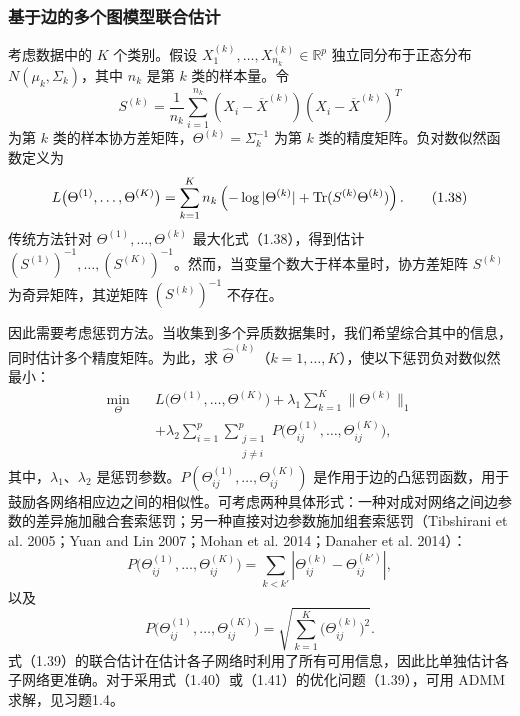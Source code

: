 \subsubsection{基于边的多个图模型联合估计}

考虑数据中的 $K$ 个类别。假设 $X_1^{(k)},\ldots,X_{n_k}^{(k)}\in\mathbb R^p$ 独立同分布于正态分布 $N(\mu_k,\Sigma_k)$，其中 $n_k$ 是第 $k$ 类的样本量。令
\[
S^{(k)}=\frac1{n_k}\sum_{i=1}^{n_k}(X_i-\overline X^{(k)})(X_i-\overline X^{(k)})^T
\]
为第 $k$ 类的样本协方差矩阵，$\Theta^{(k)}=\Sigma_k^{-1}$ 为第 $k$ 类的精度矩阵。负对数似然函数定义为
\begin{equation}
L\bigl(\Theta^{(1)},\ldots,\Theta^{(K)}\bigr)
=\sum_{k=1}^K n_k\left(-\log|\Theta^{(k)}|+\operatorname{Tr}(S^{(k)}\Theta^{(k)})\right).
\tag{1.38}
\end{equation}
传统方法针对 $\Theta^{(1)},\ldots,\Theta^{(k)}$ 最大化式（1.38），得到估计 $(S^{(1)})^{-1},\ldots,(S^{(K)})^{-1}$。然而，当变量个数大于样本量时，协方差矩阵 $S^{(k)}$ 为奇异矩阵，其逆矩阵 $(S^{(k)})^{-1}$ 不存在。

因此需要考虑惩罚方法。当收集到多个异质数据集时，我们希望综合其中的信息，同时估计多个精度矩阵。为此，求 $\widehat\Theta^{(k)}$（$k=1,\ldots,K$），使以下惩罚负对数似然最小：
\begin{equation}
\begin{aligned}
\min_{\Theta}\quad&L\bigl(\Theta^{(1)},\ldots,\Theta^{(K)}\bigr)
+\lambda_1\sum_{k=1}^K\|\Theta^{(k)}\|_1\\
&+\lambda_2\sum_{i=1}^p\sum_{\substack{j=1\\j\ne i}}^p
P\bigl(\Theta_{ij}^{(1)},\ldots,\Theta_{ij}^{(K)}\bigr),
\end{aligned}\tag{1.39}
\end{equation}
其中，$\lambda_1$、$\lambda_2$ 是惩罚参数。$P(\Theta_{ij}^{(1)},\ldots,\Theta_{ij}^{(K)})$ 是作用于边的凸惩罚函数，用于鼓励各网络相应边之间的相似性。可考虑两种具体形式：一种对成对网络之间边参数的差异施加融合套索惩罚；另一种直接对边参数施加组套索惩罚（Tibshirani et al. 2005；Yuan and Lin 2007；Mohan et al. 2014；Danaher et al. 2014）：
\begin{equation}
P\bigl(\Theta_{ij}^{(1)},\ldots,\Theta_{ij}^{(K)}\bigr)
=\sum_{k<k'}\left|\Theta_{ij}^{(k)}-\Theta_{ij}^{(k')}\right|,
\tag{1.40}
\end{equation}
以及
\begin{equation}
P\bigl(\Theta_{ij}^{(1)},\ldots,\Theta_{ij}^{(K)}\bigr)
=\sqrt{\sum_{k=1}^K\bigl(\Theta_{ij}^{(k)}\bigr)^2}.
\tag{1.41}
\end{equation}
式（1.39）的联合估计在估计各子网络时利用了所有可用信息，因此比单独估计各子网络更准确。对于采用式（1.40）或（1.41）的优化问题（1.39），可用 ADMM 求解，见习题1.4。

